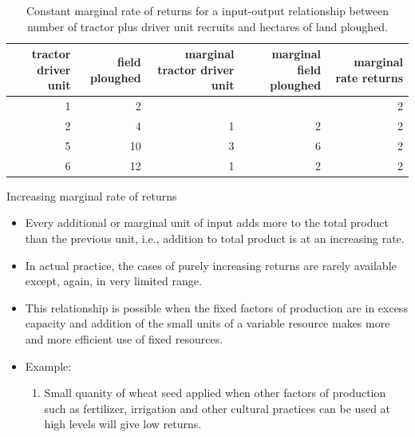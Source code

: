 \documentclass[12pt,ignorenonframetext,aspectratio=169]{beamer}
\providecommand{\tightlist}{%
  \setlength{\itemsep}{0pt}\setlength{\parskip}{0pt}}
\begin{document}
\begin{frame}{}
\protect\hypertarget{section-4}{}
\begin{table}

\caption{\label{tab:tractor-driver-unit-cmr-tab}Constant marginal rate of returns for a input-output relationship between number of tractor plus driver unit recruits and hectares of land ploughed.}
\centering
\fontsize{6}{8}\selectfont
\begin{tabular}[t]{rrrrr}
\toprule
tractor driver unit & field ploughed & marginal tractor driver unit & marginal field ploughed & marginal rate returns\\
\midrule
1 & 2 &  &  & 2\\
2 & 4 & 1 & 2 & 2\\
5 & 10 & 3 & 6 & 2\\
6 & 12 & 1 & 2 & 2\\
\bottomrule
\end{tabular}
\end{table}
\end{frame}

\begin{frame}{Increasing marginal rate of returns}
\protect\hypertarget{increasing-marginal-rate-of-returns}{}
\begin{itemize}
\tightlist
\item
  Every additional or marginal unit of input adds more to the total
  product than the previous unit, i.e., addition to total product is at
  an increasing rate.
\item
  In actual practice, the cases of purely increasing returns are rarely
  available except, again, in very limited range.
\item
  This relationship is possible when the fixed factors of production are
  in excess capacity and addition of the small units of a variable
  resource makes more and more efficient use of fixed resources.
\item
  Example:

  \begin{enumerate}
  \tightlist
  \item
    Small quanity of wheat seed applied when other factors of production
    such as fertilizer, irrigation and other cultural practices can be
    used at high levels will give low returns.
  \end{enumerate}
\end{itemize}
\end{frame}
\end{document}
